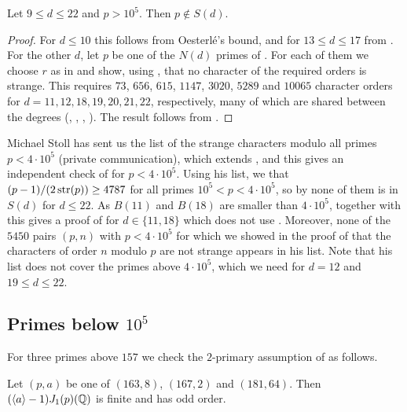 \begin{proposition}\label{prop:large}
Let $9\leq d\leq 22$ and $p>10^5$. Then $p\notin S(d)$.
\end{proposition}

\begin{proof}
For $d\leq 10$ this follows from Oesterl\'e's bound, and for $13\leq d\leq 17$ from . For the other $d$, let $p$ be one of the $N(d)$ primes of . For each of them we choose $r$ as in  and show, using , that no character of the required orders is strange. This requires $73$, $656$, $615$, $1147$, $3020$, $5289$ and $10065$ character orders for $d=11,12,18,19,20,21,22$, respectively, many of which are shared between the degrees (, , , ). The result follows from .
\end{proof}

Michael Stoll has sent us the list of the strange characters modulo all primes $p<4\cdot10^5$ (private communication), which extends \cite[Table 2]{DSt}, and this gives an independent check of  for $p<4\cdot10^5$. Using his list, we  that $(p-1)/(2\operatorname{str}(p))\geq 4787$ for all primes $10^5<p<4\cdot10^5$, so by  none of them is in $S(d)$ for $d\leq 22$. As $B(11)$ and $B(18)$ are smaller than $4\cdot10^5$, together with  this gives a proof of  for $d\in\{11,18\}$ which does not use . Moreover, none of the $5450$ pairs $(p,n)$ with $p<4\cdot10^5$ for which we showed in the proof of  that the characters of order $n$ modulo $p$ are not strange appears in his list. Note that his list does not cover the primes above $4\cdot10^5$, which we need for $d=12$ and $19\leq d\leq 22$.

\subsection{Primes below \texorpdfstring{$10^5$}{100000}}\label{sec:medium}
For three primes above $157$ we check the $2$-primary assumption of  as follows.

\begin{lemma}\label{lem:oddorder}
Let $(p,a)$ be one of $(163,8)$, $(167,2)$ and $(181,64)$. Then $(\langle a\rangle-1)J_1(p)(\mathbb{Q})$ is finite and has odd order.
\end{lemma}

